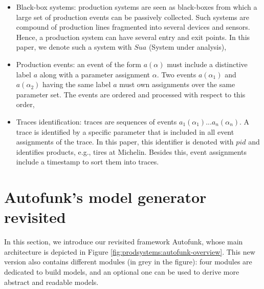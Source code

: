 \begin{itemize}
    \item Black-box systems: production systems are seen as
    black-boxes from which a large set of production events can
    be passively collected. Such systems are compound of
    production lines fragmented into several devices and sensors.
    Hence, a production system can have several entry and exit
    points. In this paper, we denote such a system with $Sua$
    (System under analysis),

    \item Production events: an event of the form $a(\alpha)$
    must include a distinctive label $a$ along with a parameter
    assignment $\alpha$. Two events $a(\alpha_1)$ and
    $a(\alpha_2)$ having the same label $a$ must own assignments
    over the same parameter set. The events are ordered and
    processed with respect to this order,

    \item Traces identification: traces are sequences of events
    $a_1(\alpha_1)$...$a_n(\alpha_n)$. A trace is identified by a
    specific parameter that is included in all event assignments
    of the trace. In this paper, this identifier is denoted with
    $pid$ and identifies products, e.g., tires at Michelin.
    Besides this, event assignments include a timestamp to sort
    them into traces.
\end{itemize}


\section{Autofunk's model generator revisited}
\label{sec:modelinf:prodsystems}

In this section, we introduce our revisited framework Autofunk,
whose main architecture is depicted in Figure
\ref{fig:prodsystems:autofunk-overview}. This new version also
contains different modules (in grey in the figure): four modules
are dedicated to build models, and an optional one can be used to
derive more abstract and readable models.


